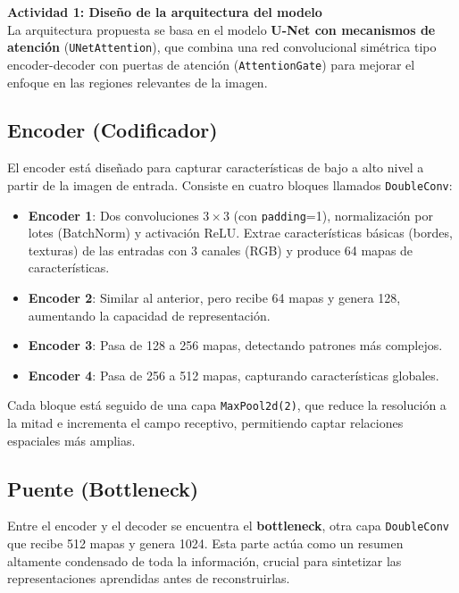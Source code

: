 \textbf{Actividad 1: Diseño de la arquitectura del modelo}\\


La arquitectura propuesta se basa en el modelo \textbf{U-Net con mecanismos de atención} (\texttt{UNetAttention}), que combina una red convolucional simétrica tipo encoder-decoder con puertas de atención (\texttt{AttentionGate}) para mejorar el enfoque en las regiones relevantes de la imagen.

\subsection*{Encoder (Codificador)}
El encoder está diseñado para capturar características de bajo a alto nivel a partir de la imagen de entrada. Consiste en cuatro bloques llamados \texttt{DoubleConv}:
\begin{itemize}
    \item \textbf{Encoder 1}: Dos convoluciones $3\times3$ (con \texttt{padding}=1), normalización por lotes (BatchNorm) y activación ReLU. Extrae características básicas (bordes, texturas) de las entradas con 3 canales (RGB) y produce 64 mapas de características.
    \item \textbf{Encoder 2}: Similar al anterior, pero recibe 64 mapas y genera 128, aumentando la capacidad de representación.
    \item \textbf{Encoder 3}: Pasa de 128 a 256 mapas, detectando patrones más complejos.
    \item \textbf{Encoder 4}: Pasa de 256 a 512 mapas, capturando características globales.
\end{itemize}
Cada bloque está seguido de una capa \texttt{MaxPool2d(2)}, que reduce la resolución a la mitad e incrementa el campo receptivo, permitiendo captar relaciones espaciales más amplias.

\subsection*{Puente (Bottleneck)}
Entre el encoder y el decoder se encuentra el \textbf{bottleneck}, otra capa \texttt{DoubleConv} que recibe 512 mapas y genera 1024. Esta parte actúa como un resumen altamente condensado de toda la información, crucial para sintetizar las representaciones aprendidas antes de reconstruirlas.

